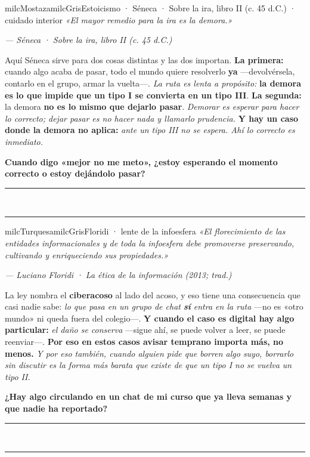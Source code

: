 \documentclass[11pt,letterpaper]{article}
\newcommand{\linead}[1]{\noindent\color{milcLinea}\rule{#1}{0.5pt}\color{milcNegro}}
\begin{document}
\begin{softbox}{milcMostaza}{milcGris}{Estoicismo · Séneca · Sobre la ira, libro II (c. 45 d.C.) · cuidado interior}
\textit{«El mayor remedio para la ira es la demora.»}

{\footnotesize\itshape\color{milcNegro!70}--- Séneca · Sobre la ira, libro II (c. 45 d.C.)}

Aquí Séneca sirve para dos cosas distintas y las dos importan. \textbf{La primera:} cuando algo acaba de pasar, todo el mundo quiere resolverlo \textbf{ya} ---devolvérsela, contarlo en el grupo, armar la vuelta---. \emph{La ruta es lenta a propósito:} \textbf{la demora es lo que impide que un tipo I se convierta en un tipo III}. \textbf{La segunda:} la demora \textbf{no es lo mismo que dejarlo pasar}. \emph{Demorar es esperar para hacer lo correcto; dejar pasar es no hacer nada y llamarlo prudencia.} \textbf{Y hay un caso donde la demora no aplica:} \emph{ante un tipo III no se espera. Ahí lo correcto es inmediato.}

\textbf{Cuando digo «mejor no me meto», ¿estoy esperando el momento correcto o estoy dejándolo pasar?}
\end{softbox}
\linead{\linewidth}\\[1mm]
\linead{\linewidth}

\begin{softbox}{milcTurquesa}{milcGris}{Floridi · lente de la infoesfera}
\textit{«El florecimiento de las entidades informacionales y de toda la infoesfera debe promoverse preservando, cultivando y enriqueciendo sus propiedades.»}

{\footnotesize\itshape\color{milcNegro!70}--- Luciano Floridi · La ética de la información (2013; trad.)}

La ley nombra el \textbf{ciberacoso} al lado del acoso, y eso tiene una consecuencia que casi nadie sabe: \emph{lo que pasa en un grupo de chat \textbf{sí} entra en la ruta} ---no es «otro mundo» ni queda fuera del colegio---. \textbf{Y cuando el caso es digital hay algo particular:} \emph{el daño se conserva} ---sigue ahí, se puede volver a leer, se puede reenviar---. \textbf{Por eso en estos casos avisar temprano importa más, no menos.} \emph{Y por eso también, cuando alguien pide que borren algo suyo, borrarlo sin discutir es la forma más barata que existe de que un tipo I no se vuelva un tipo II.}

\textbf{¿Hay algo circulando en un chat de mi curso que ya lleva semanas y que nadie ha reportado?}
\end{softbox}
\linead{\linewidth}\\[1mm]
\linead{\linewidth}
\end{document}
